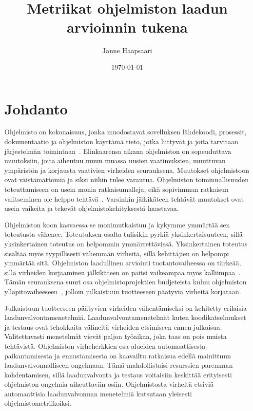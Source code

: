 \documentclass[finnish]{tktltiki2}
\title{Metriikat ohjelmiston laadun arvioinnin tukena}
\author{Janne Haapsaari}
\date{\today}
\theoremstyle{definition}
\theoremstyle{remark}
\begin{document}

\frontmatter      %

\maketitle        %
\makeabstract     %

\tableofcontents  %


\mainmatter       %
\onehalfspacing

\section{Johdanto}

Ohjelmisto on kokonaisuus, jonka muodostavat sovelluksen lähdekoodi, prosessit, dokumentaatio ja ohjelmiston käyttämä tieto, jotka liittyvät ja joita tarvitaan järjestelmän toimintaan~\cite{IEEE90, ISO9000}. Elinkaarensa aikana ohjelmiston on sopeuduttava muutoksiin, joita aiheutuu muun muassa uusien vaatimuksien, muuttuvan ympäristön ja korjausta vaativien virheiden seurauksena. Muutokset ohjelmistoon ovat väistämättömiä ja siksi niihin tulee varautua. Ohjelmiston toiminnallisuuden toteuttamiseen on usein monia ratkaisumalleja, eikä sopivimman ratkaisun valitseminen ole helppo tehtävä~\cite{CK94}. Varsinkin jälkikäteen tehtävät muutokset ovat usein vaikeita ja tekevät ohjelmistokehityksestä haastavaa.

Ohjelmiston koon kasvaessa se monimutkaistuu ja kykymme ymmärtää sen toteutusta vähenee. Toteutuksen osalta tulisikin pyrkiä yksinkertaisuuteen, sillä yksinkertainen toteutus on helpommin ymmärrettävissä. Yksinkertainen toteutus sisältää myös tyypillisesti vähemmän virheitä, sillä kehittäjien on helpompi ymmärtää sitä. Ohjelmiston laadullinen arviointi tuotantovaiheessa on tärkeää, sillä virheiden korjaaminen jälkikäteen on paitsi vaikeampaa myös kalliimpaa~\cite{T02}. Tämän seurauksena suuri osa ohjelmistoprojektien budjeteista kuluu ohjelmiston ylläpitovaiheeseen~\cite{CALO94, G83}, jolloin julkaistuun tuotteeseen päätyviä virheitä korjataan.

Julkaistuun tuotteeseen päätyvien virheiden vähentämiseksi on kehitetty erilaisia laadunvalvontamenetelmiä. Laadunvalvontamenetelmät kuten koodikatselmukset ja testaus ovat tehokkaita välineitä virheiden etsimiseen ennen julkaisua. Valitettavasti menetelmät vievät paljon työaikaa, joka taas on pois muista tehtävistä. Ohjelmiston virheherkkien osa-alueiden automaattisesta paikantamisesta ja ennustamisesta on kaavailtu ratkaisua edellä mainittuun laadunvalvonnalliseen ongelmaan. Tämä mahdollistaisi resurssien paremman kohdentamisen, sillä laadunvalvonta ja testaus voitaisiin keskittää erityisesti ohjelmiston ongelmia aiheuttaviin osiin. Ohjelmistosta virheitä etsiviä automaattisia laadunvalvonnan menetelmiä kutsutaan yleisesti ohjelmistometriikoiksi.
\end{document}
